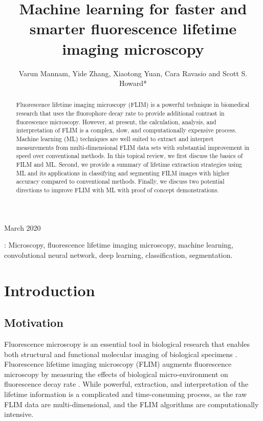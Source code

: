 \documentclass[12pt]{iopart}
\begin{document}
\title[Machine learning for FLIM]{Machine learning for faster and smarter fluorescence lifetime imaging microscopy}


\author{Varun Mannam, Yide Zhang, Xiaotong Yuan, Cara Ravasio and Scott S. Howard*}
\address{Department of Electrical Engineering, University of Notre Dame, Notre Dame, IN 46556, USA}
\address{Caltech Optical Imaging Laboratory, Andrew and Peggy Cherng Department of Medical Engineering,  California Institute of Technology, Pasadena, CA 91125, USA}
\vspace{10pt}
\begin{indented}
\item[]March 2020
\end{indented}

\begin{abstract}
Fluorescence lifetime imaging microscopy (FLIM) is a powerful technique in biomedical research that uses the fluorophore decay rate to provide additional contrast in fluorescence microscopy. However, at present, the calculation, analysis, and interpretation of FLIM is a complex, slow, and computationally expensive process. Machine learning (ML) techniques are well suited to extract and interpret measurements from multi-dimensional FLIM data sets with substantial improvement in speed over conventional methods. In this topical review, we first discuss the basics of FILM and ML. Second, we provide a summary of lifetime extraction strategies using ML and its applications in classifying and segmenting FILM images with higher accuracy compared to conventional methods. Finally, we discuss two potential directions to improve FLIM with ML with proof of concept demonstrations.
\end{abstract}
\vspace{2pc}
: Microscopy, fluorescence lifetime imaging microscopy, machine learning, convolutional neural network, deep learning, classification, segmentation.

\section{Introduction}
\subsection{Motivation} \label{moto}
Fluorescence microscopy is an essential tool in biological research that enables both structural and functional molecular imaging of biological specimens \cite{FluorescenceMicroscopy}. Fluorescence lifetime imaging microscopy (FLIM) augments fluorescence microscopy by measuring the effects of biological micro-environment on fluorescence decay rate \cite{FLIM2007}. While powerful, extraction, and interpretation of the lifetime information is a complicated and time-consuming process, as the raw FLIM data are multi-dimensional, and the FLIM algorithms are computationally intensive.  
\end{document}
